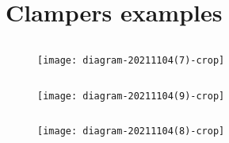 \section{Clampers examples}
\begin{example}$\left. \right. $\\
	\begin{figure}[H]
		\centering
		\texttt{[image: diagram-20211104(7)-crop]}
	\end{figure}
\end{example}
 
\begin{example}$\left. \right. $\\
\begin{figure}[H]
\centering
\texttt{[image: diagram-20211104(9)-crop]}
\end{figure}
\end{example}
\begin{example}$\left. \right. $\\
\begin{figure}[H]
\centering
\texttt{[image: diagram-20211104(8)-crop]}
\end{figure}
\end{example}

